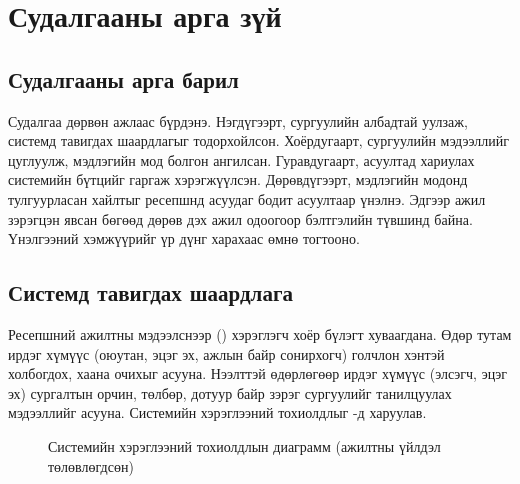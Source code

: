 \chapter{Судалгааны арга зүй}
\label{ch:method}


\section{Судалгааны арга барил}
\label{sec:approach}

Судалгаа дөрвөн ажлаас бүрдэнэ. Нэгдүгээрт, сургуулийн албадтай уулзаж, системд тавигдах шаардлагыг тодорхойлсон. Хоёрдугаарт, сургуулийн мэдээллийг цуглуулж, мэдлэгийн мод болгон ангилсан. Гуравдугаарт, асуултад хариулах системийн бүтцийг гаргаж хэрэгжүүлсэн. Дөрөвдүгээрт, мэдлэгийн модонд тулгуурласан хайлтыг ресепшнд асуудаг бодит асуултаар үнэлнэ. Эдгээр ажил зэрэгцэн явсан бөгөөд дөрөв дэх ажил одоогоор бэлтгэлийн түвшинд байна. Үнэлгээний хэмжүүрийг үр дүнг харахаас өмнө тогтооно.

\section{Системд тавигдах шаардлага}
\label{sec:requirements}

Ресепшний ажилтны мэдээлснээр () хэрэглэгч хоёр бүлэгт хуваагдана. Өдөр тутам ирдэг хүмүүс (оюутан, эцэг эх, ажлын байр сонирхогч) голчлон хэнтэй холбогдох, хаана очихыг асууна. Нээлттэй өдөрлөгөөр ирдэг хүмүүс (элсэгч, эцэг эх) сургалтын орчин, төлбөр, дотуур байр зэрэг сургуулийг танилцуулах мэдээллийг асууна. Системийн хэрэглээний тохиолдлыг -д харуулав.

\begin{figure}[ht]
\centering
{}
\caption{Системийн хэрэглээний тохиолдлын диаграмм (ажилтны үйлдэл төлөвлөгдсөн)}
\label{fig:usecase}
\end{figure}

